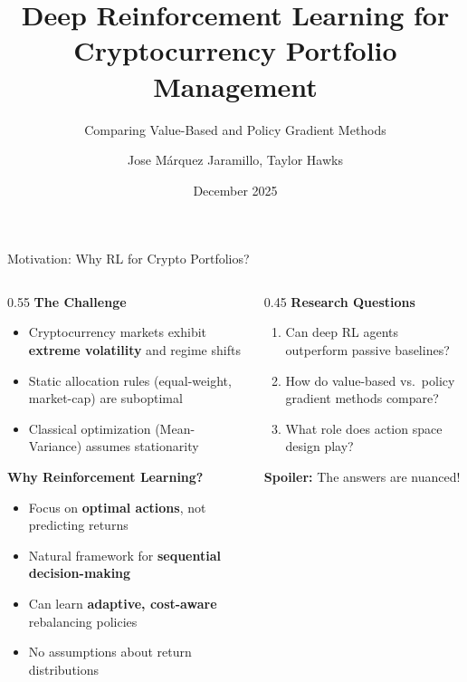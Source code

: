 \documentclass[aspectratio=169]{beamer}
\title{Deep Reinforcement Learning for Cryptocurrency Portfolio Management}
\subtitle{Comparing Value-Based and Policy Gradient Methods}
\author{Jose Márquez Jaramillo, Taylor Hawks}
\institute{Johns Hopkins University \\ EN.605.741 Reinforcement Learning}
\date{December 2025}
\begin{document}
{
\setcounter{framenumber}{0}
\begin{frame}[plain]
  \titlepage
\end{frame}
}

\begin{frame}{Motivation: Why RL for Crypto Portfolios?}
\footnotesize

\begin{columns}[T,totalwidth=\textwidth]
\begin{column}{0.55\textwidth}
\textbf{The Challenge}
\begin{itemize}\setlength{\itemsep}{2pt}
  \item Cryptocurrency markets exhibit \textbf{extreme volatility} and regime shifts
  \item Static allocation rules (equal-weight, market-cap) are suboptimal~\citep{demiguel2009optimal}
  \item Classical optimization (Mean-Variance) assumes stationarity~\citep{markowitz1952portfolio}
\end{itemize}

\vspace{0.3em}
\textbf{Why Reinforcement Learning?}
\begin{itemize}\setlength{\itemsep}{2pt}
  \item Focus on \textbf{optimal actions}, not predicting returns
  \item Natural framework for \textbf{sequential decision-making}
  \item Can learn \textbf{adaptive, cost-aware} rebalancing policies~\citep{jiang2017eIIE}
  \item No assumptions about return distributions
\end{itemize}
\end{column}

\begin{column}{0.45\textwidth}
\textbf{Research Questions}
\begin{enumerate}\setlength{\itemsep}{4pt}
  \item Can deep RL agents outperform passive baselines?
  \item How do value-based vs.\ policy gradient methods compare?
  \item What role does action space design play?
\end{enumerate}

\vspace{0.3em}
\textbf{Spoiler:} The answers are nuanced!
\end{column}
\end{columns}

\end{frame}
\end{document}
